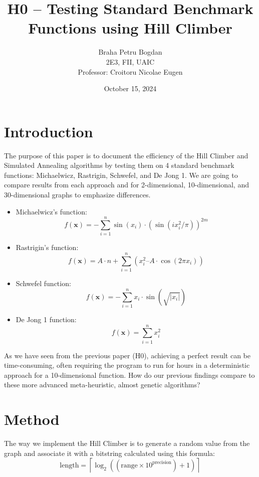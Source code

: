 \documentclass{article}
\title{H0 – Testing Standard Benchmark Functions using Hill Climber}
\author{Braha Petru Bogdan \\ 2E3, FII, UAIC \\ Professor: Croitoru Nicolae Eugen}
\date{October 15, 2024}
\begin{document}
\maketitle

\let\oldsection\section
\renewcommand{\section}[1]{
  \oldsection{#1}
  \noindent
}

\newpage
\section{Introduction}
The purpose of this paper is to document the efficiency of the Hill Climber and Simulated Annealing algorithms by testing them on 4 standard benchmark functions: Michaelwicz, Rastrigin, Schwefel, and De Jong 1. We are going to compare results from each approach and for 2-dimensional, 10-dimensional, and 30-dimensional graphs to emphasize differences.

\begin{itemize}
\item Michaelwicz’s function:
$$f(\mathbf{x}) = -\sum_{i=1}^{n} \sin(x_i) \cdot \left(\sin\left(ix_i^2 / \pi\right)\right)^{2m} $$
\item Rastrigin’s function:
$$f(\mathbf{x}) = A \cdot n + \sum_{i=1}^{n} \left( x_i^2 – A \cdot \cos(2\pi x_i) \right) $$
\item Schwefel function:
$$f(\mathbf{x}) = -\sum_{i=1}^{n} x_i \cdot \sin\left(\sqrt{|x_i|}\right)$$
\item De Jong 1 function:
$$f(\mathbf{x}) = \sum_{i=1}^{n} x_i^2$$
\end{itemize}

As we have seen from the previous paper (H0), achieving a perfect result can be time-consuming, often requiring the program to run for hours in a deterministic approach for a 10-dimensional function. How do our previous findings compare to these more advanced meta-heuristic, almost genetic algorithms?

\newpage
\section{Method}
The way we implement the Hill Climber is to generate a random value from the graph and associate it with a bitstring calculated using this formula:
$$\text{length} = \left\lceil \log_2\left( (\text{range} \times 10^{\text{precision}}) + 1 \right) \right\rceil$$
\end{document}
